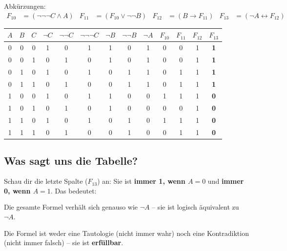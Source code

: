 \documentclass[a4paper,12pt]{article}
\begin{document}
Abk\"urzungen:
\begin{align*}
F_{10} &= (\neg\neg\neg C \wedge A) &
F_{11} &= (F_{10} \vee \neg\neg B) &
F_{12} &= (B \to F_{11}) &
F_{13} &= (\neg A \leftrightarrow F_{12})
\end{align*}

\begin{center}
\renewcommand{\arraystretch}{1.25}
\begin{tabular}{ccc|cccccc|cccc}
\toprule
$A$ & $B$ & $C$
  & $\neg C$ & $\neg\neg C$ & $\neg\neg\neg C$
  & $\neg B$ & $\neg\neg B$ & $\neg A$
  & $F_{10}$ & $F_{11}$ & $F_{12}$ & $F_{13}$ \\
\midrule
0 & 0 & 0  & 1 & 0 & 1  & 1 & 0 & 1  & 0 & 0 & 1 & \textbf{1} \\
0 & 0 & 1  & 0 & 1 & 0  & 1 & 0 & 1  & 0 & 0 & 1 & \textbf{1} \\
0 & 1 & 0  & 1 & 0 & 1  & 0 & 1 & 1  & 0 & 1 & 1 & \textbf{1} \\
0 & 1 & 1  & 0 & 1 & 0  & 0 & 1 & 1  & 0 & 1 & 1 & \textbf{1} \\
1 & 0 & 0  & 1 & 0 & 1  & 1 & 0 & 0  & 1 & 1 & 1 & \textbf{0} \\
1 & 0 & 1  & 0 & 1 & 0  & 1 & 0 & 0  & 0 & 0 & 1 & \textbf{0} \\
1 & 1 & 0  & 1 & 0 & 1  & 0 & 1 & 0  & 1 & 1 & 1 & \textbf{0} \\
1 & 1 & 1  & 0 & 1 & 0  & 0 & 1 & 0  & 0 & 1 & 1 & \textbf{0} \\
\bottomrule
\end{tabular}
\end{center}

\subsection{Was sagt uns die Tabelle?}

\begin{merkbox}
Schau dir die letzte Spalte ($F_{13}$) an: Sie ist \textbf{immer 1,
wenn $A = 0$} und \textbf{immer 0, wenn $A = 1$}. Das bedeutet:

Die gesamte Formel verh\"alt sich genauso wie $\neg A$ -- sie ist
logisch \"aquivalent zu $\neg A$.

\medskip
Die Formel ist weder eine Tautologie (nicht immer wahr) noch eine
Kontradiktion (nicht immer falsch) -- sie ist \textbf{erf\"ullbar}.
\end{merkbox}
\end{document}

